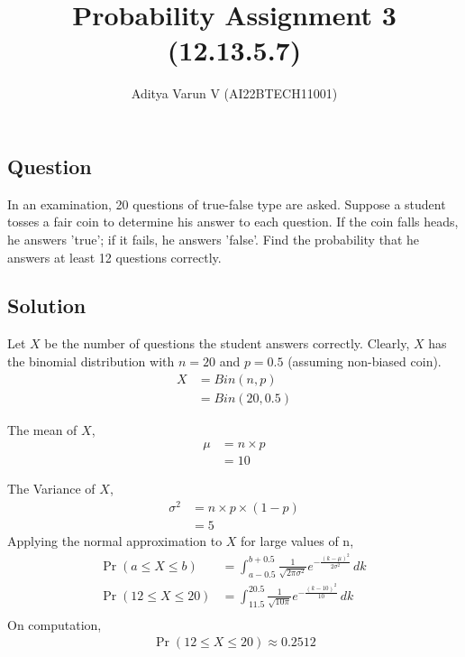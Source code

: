 \documentclass[12pt,twocolumn,notitlepage]{article}
\title{Probability Assignment 3 (12.13.5.7)}
\author{Aditya Varun V (AI22BTECH11001)}
\date{}
\providecommand{\pr}[1]{\ensuremath{\Pr\left(#1\right)}}
\begin{document}
\maketitle
\subsection*{Question}
In an examination, 20 questions of true-false type are asked. Suppose a student tosses a fair coin to determine his answer to each question. If the coin falls heads, he answers 'true'; if it fails, he answers 'false'. Find the probability that he answers at least 12 questions correctly.


\subsection*{Solution}

Let $X$ be the number of questions the student answers correctly. Clearly, $X$ has the binomial distribution with $n=20$ and $p=0.5$ (assuming non-biased coin). 
\begin{align}
    X&=Bin(n,p)\\
    &=Bin(20,0.5)
\end{align}

The mean of $X$,   
\begin{align}
    \mu &= n\times p\\
    &= 10
\end{align}

The Variance of $X$,
\begin{align}
    \sigma^2 &= n\times p\times (1-p)\\
    &= 5
\end{align}
Applying the normal approximation to $X$ for large values of n,
\begin{align}
	\pr{a \le X \le b}&= \int_{a-0.5}^{b+0.5} \frac{1}{\sqrt{2\pi\sigma^2}}e^{-\frac{(k-\mu)^2}{2\sigma^2}}\,dk\ \\
	\pr{12 \le X \le 20}&= \int_{11.5}^{20.5} \frac{1}{\sqrt{10\pi}}e^{-\frac{(k-10)^2}{10}}\,dk\ \\
\end{align}
On computation,
\begin{align} 
	\pr{12 \le X \le 20} \approx 0.2512 
\end{align}
\end{document}
